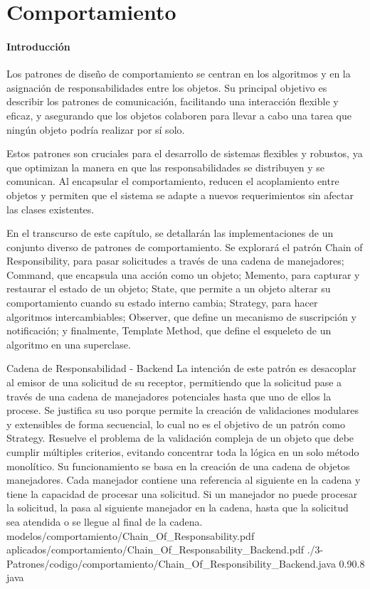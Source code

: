 \chapter{Comportamiento}
\subsubsection{Introducción}{
    Los patrones de diseño de comportamiento se centran en los algoritmos y en la asignación de responsabilidades entre los objetos. Su principal objetivo es describir los patrones de comunicación, facilitando una interacción flexible y eficaz, y asegurando que los objetos colaboren para llevar a cabo una tarea que ningún objeto podría realizar por sí solo.

    Estos patrones son cruciales para el desarrollo de sistemas flexibles y robustos, ya que optimizan la manera en que las responsabilidades se distribuyen y se comunican. Al encapsular el comportamiento, reducen el acoplamiento entre objetos y permiten que el sistema se adapte a nuevos requerimientos sin afectar las clases existentes.

    En el transcurso de este capítulo, se detallarán las implementaciones de un conjunto diverso de patrones de comportamiento. Se explorará el patrón Chain of Responsibility, para pasar solicitudes a través de una cadena de manejadores; Command, que encapsula una acción como un objeto; Memento, para capturar y restaurar el estado de un objeto; State, que permite a un objeto alterar su comportamiento cuando su estado interno cambia; Strategy, para hacer algoritmos intercambiables; Observer, que define un mecanismo de suscripción y notificación; y finalmente, Template Method, que define el esqueleto de un algoritmo en una superclase.
}

\Patron
    {Cadena de Responsabilidad - Backend}
    {La intención de este patrón es desacoplar al emisor de una solicitud de su receptor, permitiendo que la solicitud pase a través de una cadena de manejadores potenciales hasta que uno de ellos la procese. Se justifica su uso porque permite la creación de validaciones modulares y extensibles de forma secuencial, lo cual no es el objetivo de un patrón como Strategy.}
    {Resuelve el problema de la validación compleja de un objeto que debe cumplir múltiples criterios, evitando concentrar toda la lógica en un solo método monolítico. Su funcionamiento se basa en la creación de una cadena de objetos manejadores. Cada manejador contiene una referencia al siguiente en la cadena y tiene la capacidad de procesar una solicitud. Si un manejador no puede procesar la solicitud, la pasa al siguiente manejador en la cadena, hasta que la solicitud sea atendida o se llegue al final de la cadena.}
    {modelos/comportamiento/Chain_Of_Responsability.pdf}
    {aplicados/comportamiento/Chain_Of_Responsability_Backend.pdf}
    {./3-Patrones/codigo/comportamiento/Chain_Of_Responsibility_Backend.java}
    {0.9}{0.8}
    {java}
\newpage

